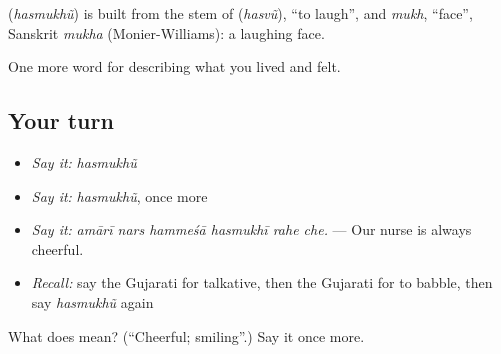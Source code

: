 \begin{cousinweb}
\textbf{} (\emph{hasmukhũ}) is built from the stem of \textbf{} (\emph{hasvũ}), \textquotedblleft{}to laugh\textquotedblright{}, and \emph{mukh}, \textquotedblleft{}face\textquotedblright{}, Sanskrit \emph{mukha} (Monier-Williams): a laughing face.
\end{cousinweb}

\begin{grammarlens}[title={What you've built}]
One more word for describing what you lived and felt.
\end{grammarlens}

\subsection*{Your turn}
\begin{itemize}
\raggedright
  \item \emph{Say it:} \emph{hasmukhũ}
  \item \emph{Say it:} \emph{hasmukhũ}, once more
  \item \emph{Say it:} \emph{amārī nars hammeśā hasmukhī rahe che.} — Our nurse is always cheerful.
  \item \emph{Recall:} say the Gujarati for talkative, then the Gujarati for to babble, then say \emph{hasmukhũ} again
\end{itemize}

\begin{tcolorbox}[breakable,colback=teal!4,colframe=teal!35!black,title={Before you move on}]
What does  mean? (\textquotedblleft{}Cheerful; smiling\textquotedblright{}.) Say it once more.
\end{tcolorbox}
